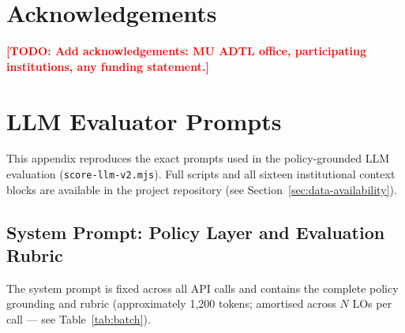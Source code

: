\documentclass[12pt, a4paper]{article}
\newcommand{\todo}[1]{\textcolor{red}{\textbf{[TODO: #1]}}}
\begin{document}
\section*{Acknowledgements}

\todo{Add acknowledgements: MU ADTL office, participating institutions, any funding statement.}




\appendix

\section{LLM Evaluator Prompts}
\label{app:prompts}

This appendix reproduces the exact prompts used in the policy-grounded LLM
evaluation (\texttt{score-llm-v2.mjs}). Full scripts and all sixteen institutional
context blocks are available in the project repository
(see Section~\ref{sec:data-availability}).

\subsection{System Prompt: Policy Layer and Evaluation Rubric}
\label{app:system-prompt}

The system prompt is fixed across all API calls and contains the complete policy
grounding and rubric (approximately 1,200 tokens; amortised across $N$ LOs per
call --- see Table~\ref{tab:batch}).
\end{document}
